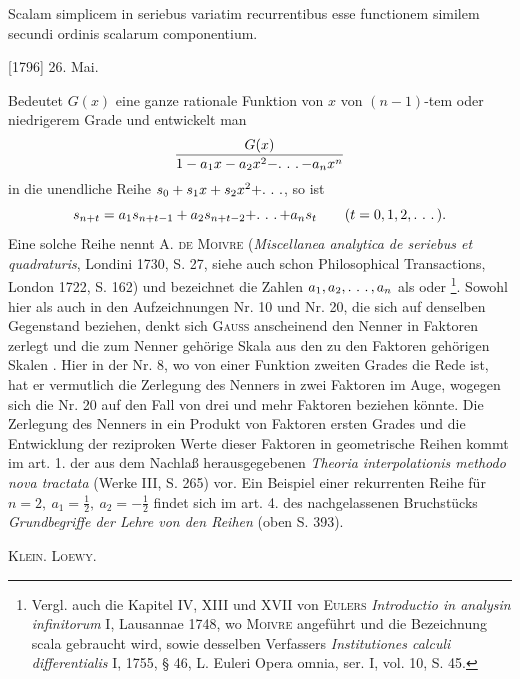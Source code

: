 \indent Scalam simplicem in seriebus variatim recurrentibus esse functionem similem secundi ordinis scalarum componentium.
\par\noindent\hfill[1796] 26. Mai.

\medskip\begingroup\small
\indent Bedeutet \(G(x)\) eine ganze rationale Funktion von \(x\) von \((n-1)\)-tem oder niedrigerem Grade und entwickelt man
\[
\frac{G(x)}{1-a_1x-a_2x^2-\ldotp\,\ldotp\,\ldotp-a_nx^n}
\]
\noindent in die unendliche Reihe \(s_0+s_1x+s_2x^2+\ldotp\,\ldotp\,\ldotp\), so ist
\[
s_{n+t}=a_1s_{n+t-1}+a_2s_{n+t-2}+\ldotp\,\ldotp\,\ldotp+a_ns_t\qquad(t=0,1,2,\ldotp\,\ldotp\,\ldotp).
\]
\noindent Eine solche Reihe nennt A. \textsc{de Moivre} (\textit{Miscellanea analytica de seriebus et quadraturis}, Londini 1730, S. 27, siehe auch schon Philosophical Transactions, London 1722, S. 162)  und bezeichnet die Zahlen \(a_1,a_2,\ldotp\,\ldotp\,\ldotp,a_n\) als  oder \begingroup\renewcommand{\thefootnote}{***)}\footnote{Vergl. auch die Kapitel IV, XIII und XVII von \textsc{Eulers} \textit{Introductio in analysin infinitorum} I, Lausannae 1748, wo \textsc{Moivre} angeführt und die Bezeichnung scala gebraucht wird, sowie desselben Verfassers \textit{Institutiones calculi differentialis} I, 1755, § 46, L. Euleri Opera omnia, ser. I, vol. 10, S. 45.}\endgroup. Sowohl hier als auch in den Aufzeichnungen Nr. 10 und Nr. 20, die sich auf denselben Gegenstand beziehen, denkt sich \textsc{Gauss} anscheinend den Nenner in Faktoren zerlegt und die zum Nenner gehörige  Skala aus den zu den Faktoren gehörigen Skalen . Hier in der Nr. 8, wo von einer Funktion zweiten Grades die Rede ist, hat er vermutlich die Zerlegung des Nenners in zwei Faktoren im Auge, wogegen sich die Nr. 20 auf den Fall von drei und mehr Faktoren beziehen könnte. Die Zerlegung des Nenners in ein Produkt von Faktoren ersten Grades und die Entwicklung der reziproken Werte dieser Faktoren in geometrische Reihen kommt im art. 1. der aus dem Nachlaß herausgegebenen \textit{Theoria interpolationis methodo nova tractata} (Werke III, S. 265) vor. Ein Beispiel einer rekurrenten Reihe für \(n=2,\ a_1=\frac12,\ a_2=-\frac12\) findet sich im art. 4. des nachgelassenen Bruchstücks \textit{Grundbegriffe der Lehre von den Reihen} (oben S. 393).
\par\noindent\hfill\textsc{Klein. Loewy.}
\par\endgroup

